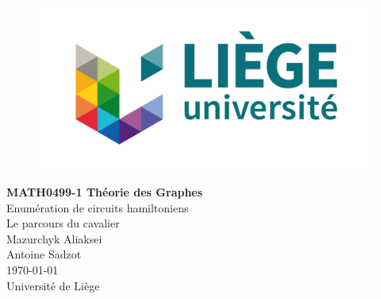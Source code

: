 \begin{titlepage}

   \begin{figure}[htbp]
      \centering
      \includegraphics{img/uliege-logo-couleurs-300.jpg}
   \end{figure}
  	
  	\hfill

	\begin{center}
		\vfill
		\textbf{
		\Huge{MATH0499-1 Théorie des Graphes}}\\
		\bigskip
		\huge{Enumération de circuits hamiltoniens \\Le parcours du cavalier}\\
		\bigskip %
		\smallskip
		\Large{Mazurchyk Aliaksei\\Antoine Sadzot} \\
		\bigskip
		\smallskip
		\large{\today}\\%
		\vfill
		\large{Université de Liège}
	\end{center}
\end{titlepage}
